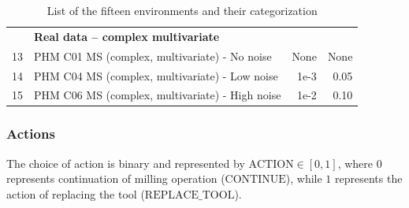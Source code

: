 \documentclass[a4paper, 12pt]{article}
\begin{document}
\begin{table}
\begin{tabular}{@{}r l rr@{}}
		\rule{0pt}{1.5\normalbaselineskip}
		& \multicolumn{3}{l}{\textbf{Real data -- complex multivariate}}\\
		13 & PHM C01 MS (complex, multivariate) - No noise & None & None \\
		14 & PHM C04 MS (complex, multivariate) - Low noise & 1e-3 & 0.05 \\
		15 & PHM C06 MS (complex, multivariate) - High noise & 1e-2 & 0.10 \\ \bottomrule
	\end{tabular}
	\caption{List of the fifteen environments and their categorization}
	\label{tbl:ListEnvironments}
\end{table}

\subsubsection*{Actions}
The choice of action is binary and represented by $\text{ACTION} \in [0, 1]$, where $0$ represents continuation of milling operation ($\text{CONTINUE}$), while $1$ represents the action of replacing the tool ($\text{REPLACE\_TOOL}$).
\end{document}
